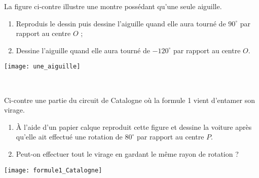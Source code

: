 \begin{activite}

\begin{partie}
 \begin{minipage}[c]{0.68\linewidth}
La figure ci-contre illustre une montre possédant qu'une seule aiguille.
\begin{enumerate}
 \item Reproduis le dessin puis dessine l'aiguille quand elle aura tourné de $90^\circ$ par rapport au centre $O$ ;
 \item Dessine l'aiguille quand elle aura tourné de $- 120^\circ$ par rapport au centre $O$.
 \end{enumerate}
  \end{minipage} \hfill%
  \begin{minipage}[c]{0.28\linewidth}
  \texttt{[image: une\_aiguille]}
  \end{minipage} \\ 
\end{partie}

\begin{partie}[Le virage]
 \begin{minipage}[c]{0.50\linewidth}
Ci-contre une partie du circuit de Catalogne où la formule 1 vient d'entamer son virage.
\begin{enumerate}
 \item À l'aide d'un papier calque reproduit cette figure et dessine la voiture après qu'elle ait effectué une rotation de $80^\circ$ par rapport au centre $P$.
 \item Peut-on effectuer tout le virage en gardant le même rayon de rotation ?
 \end{enumerate}
  \end{minipage} \hfill%
  \begin{minipage}[c]{0.46\linewidth}
  \texttt{[image: formule1\_Catalogne]}
  \end{minipage} \\ 
\end{partie}


\end{activite}
